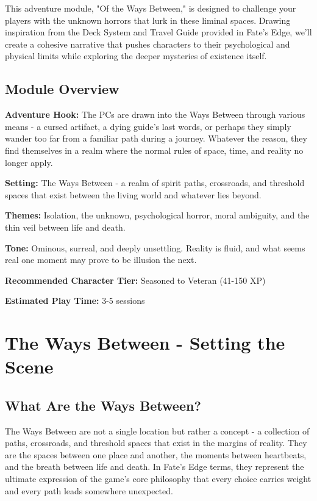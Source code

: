 \documentclass[11pt]{article}
\begin{document}
This adventure module, "Of the Ways Between," is designed to challenge your players with the unknown horrors that lurk in these liminal spaces. Drawing inspiration from the Deck System and Travel Guide provided in Fate's Edge, we'll create a cohesive narrative that pushes characters to their psychological and physical limits while exploring the deeper mysteries of existence itself.

\subsection{Module Overview}

\textbf{Adventure Hook:} The PCs are drawn into the Ways Between through various means - a cursed artifact, a dying guide's last words, or perhaps they simply wander too far from a familiar path during a journey. Whatever the reason, they find themselves in a realm where the normal rules of space, time, and reality no longer apply.

\textbf{Setting:} The Ways Between - a realm of spirit paths, crossroads, and threshold spaces that exist between the living world and whatever lies beyond.

\textbf{Themes:} Isolation, the unknown, psychological horror, moral ambiguity, and the thin veil between life and death.

\textbf{Tone:} Ominous, surreal, and deeply unsettling. Reality is fluid, and what seems real one moment may prove to be illusion the next.

\textbf{Recommended Character Tier:} Seasoned to Veteran (41-150 XP)

\textbf{Estimated Play Time:} 3-5 sessions

\section{The Ways Between - Setting the Scene}

\subsection{What Are the Ways Between?}

The Ways Between are not a single location but rather a concept - a collection of paths, crossroads, and threshold spaces that exist in the margins of reality. They are the spaces between one place and another, the moments between heartbeats, and the breath between life and death. In Fate's Edge terms, they represent the ultimate expression of the game's core philosophy that every choice carries weight and every path leads somewhere unexpected.
\end{document}

